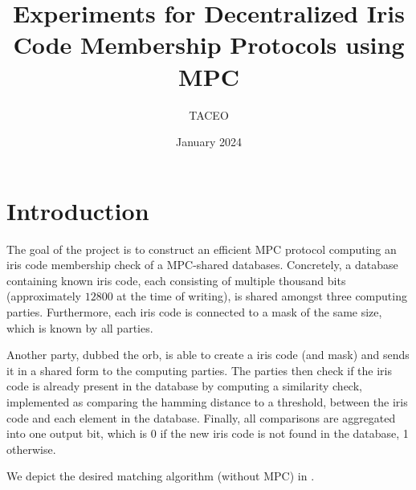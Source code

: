 \documentclass[a4paper,11pt,
]{article}
\begin{document}
\title{Experiments for Decentralized Iris Code Membership Protocols using MPC}


\date{January 2024}

\author{TACEO}

\maketitle


\section{Introduction}

The goal of the project is to construct an efficient MPC protocol computing an iris code membership check of a MPC-shared databases. Concretely, a database containing known iris code, each consisting of multiple thousand bits (approximately $12800$ at the time of writing), is shared amongst three computing parties. Furthermore, each iris code is connected to a mask of the same size, which is known by all parties.

Another party, dubbed the orb, is able to create a iris code (and mask) and sends it in a shared form to the computing parties. The parties then check if the iris code is already present in the database by computing a similarity check, implemented as comparing the hamming distance to a threshold, between the iris code and each element in the database. Finally, all comparisons are aggregated into one output bit, which is 0 if the new iris code is not found in the database, 1 otherwise.

We depict the desired matching algorithm (without MPC) in .
\end{document}
